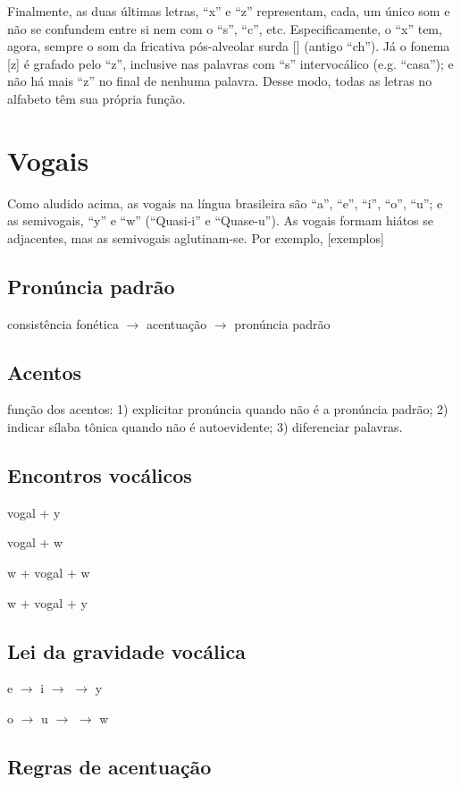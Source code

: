 \documentclass[12pt, a4paper]{article}
\begin{document}
\begin{bilingualpages}
    Finalmente, as duas últimas letras, ``x'' e ``z'' representam, cada, um único som e não se confundem entre si nem com o ``s'', ``c'', etc. Especificamente, o ``x'' tem, agora, sempre o som da fricativa pós-alveolar surda [\textesh] (antigo ``ch''). Já o fonema [z] é grafado pelo ``z'', inclusive nas palavras com ``s'' intervocálico (e.g. ``casa''); e não há mais ``z'' no final de nenhuma palavra. Desse modo, todas as letras no alfabeto têm sua própria função.

    \section{Vogais}
    Como aludido acima, as vogais na língua brasileira são ``a'', ``e'', ``i'', ``o'', ``u''; e as semivogais, ``y'' e ``w'' (``Quasi-i'' e ``Quase-u''). As vogais formam hiátos se adjacentes, mas as semivogais aglutinam-se. Por exemplo,
    [exemplos]

    \subsection{Pronúncia padrão}
    consistência fonética $\rightarrow$ acentuação $\rightarrow$ pronúncia padrão

    \subsection{Acentos}
    função dos acentos: 1) explicitar pronúncia quando não é a pronúncia padrão; 2) indicar sílaba tônica quando não é autoevidente; 3) diferenciar palavras.

    \subsection{Encontros vocálicos}
    vogal + y
    
    vogal + w
    
    w + vogal + w
    
    w + vogal + y
    
    \subsection{Lei da gravidade vocálica}
    e $\rightarrow$ i $\rightarrow$ $\rightarrow$ y
    
    o $\rightarrow$ u $\rightarrow$ $\rightarrow$ w
    
    \subsection{Regras de acentuação}
    

\end{bilingualpages}
\end{document}
